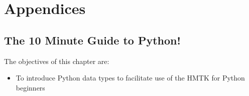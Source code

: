 \documentclass[11pt,a4paper,headings=small,dvips]{scrbook}
\newenvironment{myfancybox}{%
  \def\FrameCommand{\fboxsep=\FrameSep \fcolorbox{blue01}{honeydew}}%
  \color{black}\MakeFramed {\FrameRestore}}%
 {\endMakeFramed}
\begin{document}
\part{Appendices}
\appendix
\chapter{The 10 Minute Guide to Python!}
\label{sec:python_guide}
\begin{myfancybox}
 The objectives of this chapter are:
\begin{itemize}
     \item To introduce Python data types to facilitate use of the HMTK for Python beginners
 \end{itemize}
\end{myfancybox}



\cleardoublepage
\printglossaries
\printindex
\end{document}
